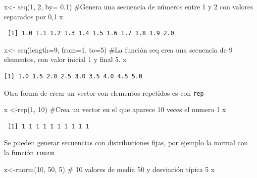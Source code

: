 \documentclass[
  letterpaper,
  DIV=11,
  numbers=noendperiod]{scrreprt}
\newenvironment{Shaded}{\begin{snugshade}}{\end{snugshade}}
\newcommand{\AttributeTok}[1]{\textcolor[rgb]{0.40,0.45,0.13}{#1}}
\newcommand{\CommentTok}[1]{\textcolor[rgb]{0.37,0.37,0.37}{#1}}
\newcommand{\DecValTok}[1]{\textcolor[rgb]{0.68,0.00,0.00}{#1}}
\newcommand{\FloatTok}[1]{\textcolor[rgb]{0.68,0.00,0.00}{#1}}
\newcommand{\FunctionTok}[1]{\textcolor[rgb]{0.28,0.35,0.67}{#1}}
\newcommand{\NormalTok}[1]{\textcolor[rgb]{0.00,0.23,0.31}{#1}}
\newcommand{\OtherTok}[1]{\textcolor[rgb]{0.00,0.23,0.31}{#1}}
\begin{document}
\begin{Shaded}
\begin{Highlighting}[]
\NormalTok{x}\OtherTok{\textless{}{-}} \FunctionTok{seq}\NormalTok{(}\DecValTok{1}\NormalTok{, }\DecValTok{2}\NormalTok{, }\AttributeTok{by=} \FloatTok{0.1}\NormalTok{)}
\CommentTok{\#Genera una secuencia de números entre 1 y 2 con valores separados por 0,1 }
\NormalTok{x }
\end{Highlighting}
\end{Shaded}

\begin{verbatim}
 [1] 1.0 1.1 1.2 1.3 1.4 1.5 1.6 1.7 1.8 1.9 2.0
\end{verbatim}

\begin{Shaded}
\begin{Highlighting}[]
\NormalTok{x}\OtherTok{\textless{}{-}} \FunctionTok{seq}\NormalTok{(}\AttributeTok{length=}\DecValTok{9}\NormalTok{, }\AttributeTok{from=}\DecValTok{1}\NormalTok{, }\AttributeTok{to=}\DecValTok{5}\NormalTok{)}
\CommentTok{\#La función seq crea una secuencia de 9 elementos, con valor inicial 1 y final 5. }
\NormalTok{x}
\end{Highlighting}
\end{Shaded}

\begin{verbatim}
[1] 1.0 1.5 2.0 2.5 3.0 3.5 4.0 4.5 5.0
\end{verbatim}

Otra forma de crear un vector con elementos repetidos es con
\texttt{rep}

\begin{Shaded}
\begin{Highlighting}[]
\NormalTok{x }\OtherTok{\textless{}{-}}\FunctionTok{rep}\NormalTok{(}\DecValTok{1}\NormalTok{, }\DecValTok{10}\NormalTok{) }\CommentTok{\#Crea un vector en el que aparece 10 veces el numero 1 }
\NormalTok{x}
\end{Highlighting}
\end{Shaded}

\begin{verbatim}
 [1] 1 1 1 1 1 1 1 1 1 1
\end{verbatim}

Se pueden generar secuencias con distribuciones fijas, por ejemplo la
normal con la función \texttt{rnorm}

\begin{Shaded}
\begin{Highlighting}[]
\NormalTok{x}\OtherTok{\textless{}{-}}\FunctionTok{rnorm}\NormalTok{(}\DecValTok{10}\NormalTok{, }\DecValTok{50}\NormalTok{, }\DecValTok{5}\NormalTok{) }\CommentTok{\# 10 valores de media 50 y desviación típica 5 }
\NormalTok{x }
\end{Highlighting}
\end{Shaded}
\end{document}

